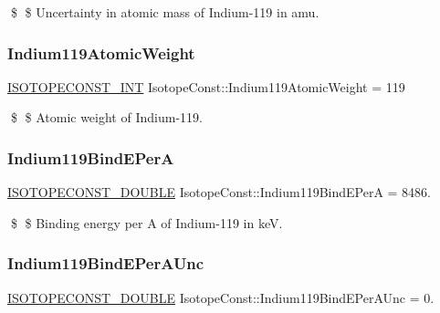 \$ \$ Uncertainty in atomic mass of Indium-\/119 in amu. \mbox{\label{group___isotope_const-_indium-_in119_ga7c62456c268070b1c053e69842e15575}} 
\subsubsection{\texorpdfstring{Indium119\+Atomic\+Weight}{Indium119AtomicWeight}}
{\footnotesize\ttfamily \mbox{\hyperlink{group___isotope_const-_macros_ga5f18360b3e99483a35c32d789e62621c}{I\+S\+O\+T\+O\+P\+E\+C\+O\+N\+S\+T\+\_\+\+I\+NT}} Isotope\+Const\+::\+Indium119\+Atomic\+Weight = 119}

\$ \$ Atomic weight of Indium-\/119. \mbox{\label{group___isotope_const-_indium-_in119_gae2343ecdee97179b0863c11ae97d59d5}} 
\subsubsection{\texorpdfstring{Indium119\+Bind\+E\+PerA}{Indium119BindEPerA}}
{\footnotesize\ttfamily \mbox{\hyperlink{group___isotope_const-_macros_ga8f45a7272ce02c0b4c65c44636ed719a}{I\+S\+O\+T\+O\+P\+E\+C\+O\+N\+S\+T\+\_\+\+D\+O\+U\+B\+LE}} Isotope\+Const\+::\+Indium119\+Bind\+E\+PerA = 8486.}

\$ \$ Binding energy per A of Indium-\/119 in keV. \mbox{\label{group___isotope_const-_indium-_in119_ga711e0885c21c3c7a1ac727cdaeded256}} 
\subsubsection{\texorpdfstring{Indium119\+Bind\+E\+Per\+A\+Unc}{Indium119BindEPerAUnc}}
{\footnotesize\ttfamily \mbox{\hyperlink{group___isotope_const-_macros_ga8f45a7272ce02c0b4c65c44636ed719a}{I\+S\+O\+T\+O\+P\+E\+C\+O\+N\+S\+T\+\_\+\+D\+O\+U\+B\+LE}} Isotope\+Const\+::\+Indium119\+Bind\+E\+Per\+A\+Unc = 0.}

